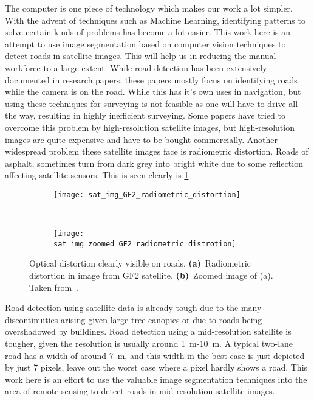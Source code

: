 The computer is one piece of technology which makes our work a lot simpler. With the advent of techniques such as Machine Learning, identifying patterns to solve certain kinds of problems has become a lot easier. This work here is an attempt to use image segmentation based on computer vision techniques to detect roads in satellite images. This will help us in reducing the manual workforce to a large extent. While road detection has been extensively documented in research papers, these papers mostly focus on identifying roads while the camera is on the road. While this has it's own uses in navigation, but using these techniques for surveying is not feasible as one will have to drive all the way, resulting in highly inefficient surveying. Some papers have tried to overcome this problem by high-resolution satellite images, but high-resolution images are quite expensive and have to be bought commercially. Another widespread problem these satellite images face is radiometric distortion. Roads of asphalt, sometimes turn from dark grey into bright white due to some reflection affecting satellite sensors. This is seen clearly is \cref{fig:sat_img_radiometric_distortion}~\cite{GF2-imageCaseStudy}.

\begin{figure}[h!]
  \centering
  \begin{subfigure}{0.48\textwidth}
    \texttt{[image: sat\_img\_GF2\_radiometric\_distortion]}
    \caption{}
  \end{subfigure}~
  \begin{subfigure}{0.48\textwidth}
    \texttt{[image: sat\_img\_zoomed\_GF2\_radiometric\_distrotion]}
    \caption{}
  \end{subfigure}
  \caption[Optical distortion clearly visible on roads]{Optical distortion clearly visible on roads. \textbf{(a)}~Radiometric distortion in image from GF2 satellite. \textbf{(b)}~Zoomed image of (a). Taken from~\cite{GF2-imageCaseStudy}.}
  \label{fig:sat_img_radiometric_distortion}
\end{figure}

Road detection using satellite data is already tough due to the many discontinuities arising given large tree canopies or due to roads being overshadowed by buildings. Road detection using a mid-resolution satellite is tougher, given the resolution is usually around 1~m-10~m. A typical two-lane road has a width of around 7~m, and this width in the best case is just depicted by just 7 pixels, leave out the worst case where a pixel hardly shows a road. This work here is an effort to use the valuable image segmentation techniques into the area of remote sensing to detect roads in mid-resolution satellite images.
